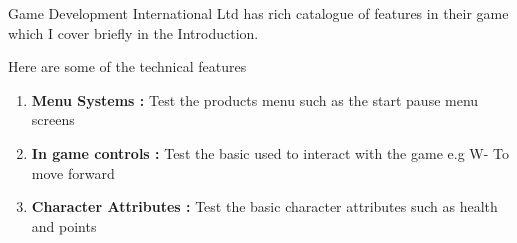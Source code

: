 Game Development International Ltd has rich catalogue of features in their game which I cover briefly in
the Introduction.

Here are some of the technical features
\begin{enumerate}
  \item    \textbf{Menu Systems :}  Test the products menu such as the start  pause menu screens
  \item    \textbf{In game controls :} Test the basic used to interact with the game e.g W- To move forward
  \item     \textbf{Character Attributes :} Test the basic character attributes such as health and points
\end{enumerate}
